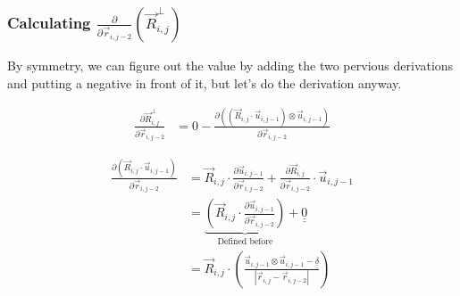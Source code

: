 \documentclass{article}
\renewcommand{\ij}{_{i,j}}
\newcommand{\ijj}{_{i,j-1}}
\newcommand{\ijk}{_{i,j-2}}
\newcommand{\ijjj}{_{i,j-2}}
\newcommand{\magn}[1]{\left\vert #1 \right\vert }
\renewcommand{\part}[2]{\frac{\partial #1 }{\partial #2}}
\newcommand{\partbig}[2]{\frac{\partial }{\partial #2}\left( #1 \right)}
\newcommand{\ten}[1]{\underline{\underline{#1}}}
\newcommand{\rij}{\vec{r} \ij}
\newcommand{\Rij}{\vec{R} \ij}
\newcommand{\rijjj}{\vec{r} \ijjj}
\newcommand{\uijj}{\vec{u} \ijj}
\begin{document}
\subsubsection{Calculating $\displaystyle\partbig{\Rij^\perp}{\rijjj}$}
By symmetry, we can figure out the value by adding the two pervious derivations
and putting a negative in front of it, but let's do the derivation anyway.

\begin{align*}
  \part{\vec{R}\ij ^ \bot}{\vec{r}\ijk}  &=  
  0
  - \part{\left(\left(\vec{R}\ij \cdot \vec{u} \ijj \right) \otimes 
  \vec{u} \ijj \right)
  }{\vec{r}\ijjj}
\end{align*}


\begin{align*}
  \part{\left(\vec{R}\ij \cdot \vec{u} \ijj \right)}{\vec{r}\ijk}   
  &= 
  \vec{R}\ij \cdot \part{\vec{u} \ijj}{\vec{r} \ijjj} + 
  \part{\vec{R} \ij}{\vec{r} \ijjj} \cdot \vec{u}\ijj
  \\
  &= 
  \underbrace{
  \left(
  \Rij \cdot  \part{\uijj}{\rijjj} 
  \right)}_{\text{Defined before}}
  +
  \ten{0} 
  \\
  &=
  \Rij \cdot 
  \left(
    \frac{\uijj \otimes \uijj - \ten{\delta}}{\magn{\rij - \rijjj}}
  \right)
\end{align*}
\end{document}
